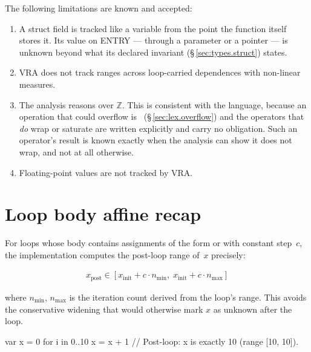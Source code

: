 \pnum
The following limitations are known and accepted:

\begin{enumerate}
  \item A struct field is tracked like a variable from the point the function
        itself stores it.  Its value on ENTRY --- through a  parameter
        or a pointer --- is unknown beyond what its declared invariant
        (\S\,\ref{sec:types.struct}) states.
  \item VRA does not track ranges across loop-carried dependences with
        non-linear measures.
  \item The analysis reasons over $\mathbb{Z}$.  This is consistent with the
        language, because an operation that could overflow is
        \illformed{}~(\S\,\ref{sec:lex.overflow}) and the operators that
        \emph{do} wrap or saturate are written explicitly and carry no
        obligation.  Such an operator's result is known exactly when the
        analysis can show it does not wrap, and not at all otherwise.
  \item Floating-point values are not tracked by VRA.
\end{enumerate}


\section{Loop body affine recap}
\label{sec:vra.affine}

\pnum
For  loops whose body contains assignments of
the form  or  with constant step~\(c\),
the implementation computes the post-loop range of~\(x\) precisely:

\begin{align*}
  x_{\text{post}} \in [x_{\text{init}} + c \cdot n_{\min},\; x_{\text{init}} + c \cdot n_{\max}]
\end{align*}

where \(n_{\min}\), \(n_{\max}\) is the iteration count derived from the
loop's range. This avoids the conservative widening that would otherwise
mark \(x\) as unknown after the loop.

\begin{example}
\begin{laincode}
var x = 0
for i in 0..10 {
    x = x + 1
}
// Post-loop: x is exactly 10 (range [10, 10]).
\end{laincode}
\end{example}

